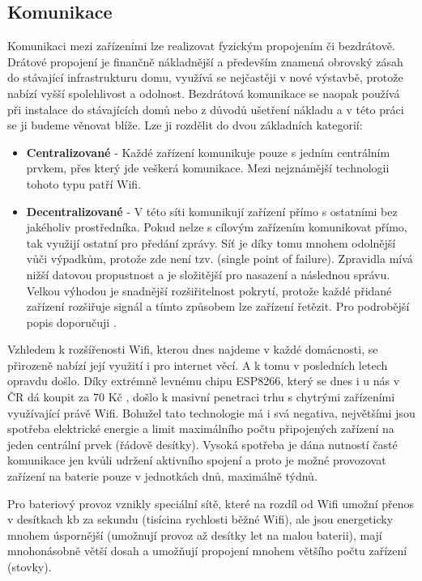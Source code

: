 \subsection{Komunikace}
Komunikaci mezi zařízeními lze realizovat fyzickým propojením či bezdrátově. Drátové propojení je finančně nákladnější a především znamená obrovský zásah do stávající infrastrukturu domu, využívá se nejčastěji v nové výstavbě, protože nabízí vyšší spolehlivost a odolnost. Bezdrátová komunikace se naopak používá při instalace do stávajících domů nebo z důvodů ušetření nákladu a v této práci se ji budeme věnovat blíže. Lze ji rozdělit do dvou základních kategorií:
\begin{itemize}
    \item \textbf{Centralizované} - Každé zařízení komunikuje pouze s jedním centrálním prvkem, přes který jde veškerá komunikace. Mezi nejznámější technologii tohoto typu patří Wifi.
    \item \textbf{Decentralizované} - V této síti komunikují zařízení přímo s ostatními bez jakéholiv prostředníka. Pokud nelze s cílovým zařízením komunikovat přímo, tak využijí ostatní pro předání zprávy. Síť je díky tomu mnohem odolnější vůči výpadkům, protože zde není tzv.  (single point of failure). Zpravidla mívá nižší datovou propustnost a je složitější pro nasazení a následnou správu. Velkou výhodou je snadnější rozšiřitelnost pokrytí, protože každé přidané zařízení rozšiřuje signál a tímto způsobem lze zařízení řetězit. Pro podrobější popis doporučuji \cite{mesh}.
\end{itemize}
Vzhledem k rozšířenosti Wifi, kterou dnes najdeme v každé domácnosti, se přirozeně nabízí její využití i pro internet věcí. A k tomu v posledních letech opravdu došlo. Díky extrémně levnému chipu ESP8266, který se dnes i u nás v ČR dá koupit za 70 Kč \cite{hadex}, došlo k masivní penetraci trhu s chytrými zařízeními využívající právě Wifi. Bohužel tato technologie má i svá negativa, největšími jsou spotřeba elektrické energie a limit maximálního počtu připojených zařízení na jeden centrální prvek (řádově desítky). Vysoká spotřeba je dána nutností časté komunikace jen kvůli udržení aktivního spojení a proto je možné provozovat zařízení na baterie pouze v jednotkách dnů, maximálně týdnů.

Pro bateriový provoz vznikly speciální sítě, které na rozdíl od Wifi umožní přenos v desítkach kb za sekundu (tisícina rychlosti běžné Wifi), ale jsou energeticky mnohem úspornější \cite{Wifi-vs-ble} (umožnují provoz až desítky let na malou baterii), mají mnohonásobně větší dosah a umožňují propojení mnohem většího počtu zařízení (stovky).

